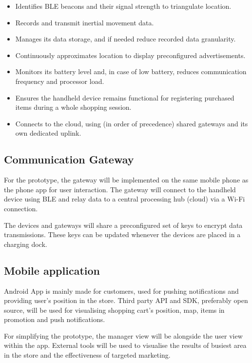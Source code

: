 \documentclass[11pt,]{article}
\providecommand{\tightlist}{%
  \setlength{\itemsep}{0pt}\setlength{\parskip}{0pt}}
\begin{document}
\begin{itemize}
\tightlist
\item
  Identifies BLE beacons and their signal strength to triangulate
  location.
\item
  Records and transmit inertial movement data.
\item
  Manages its data storage, and if needed reduce recorded data
  granularity.
\item
  Continuously approximates location to display preconfigured
  advertisements.
\item
  Monitors its battery level and, in case of low battery, reduces
  communication frequency and processor load.
\item
  Ensures the handheld device remains functional for registering
  purchased items during a whole shopping session.
\item
  Connects to the cloud, using (in order of precedence) shared gateways
  and its own dedicated uplink.
\end{itemize}

\hypertarget{communication-gateway}{%
\subsection{Communication Gateway}\label{communication-gateway}}

For the prototype, the gateway will be implemented on the same mobile
phone as the phone app for user interaction. The gateway will connect to
the handheld device using BLE and relay data to a central processing hub
(cloud) via a Wi-Fi connection.

The devices and gateways will share a preconfigured set of keys to
encrypt data transmissions. These keys can be updated whenever the
devices are placed in a charging dock.

\hypertarget{mobile-application}{%
\subsection{Mobile application}\label{mobile-application}}

Android App is mainly made for customers, used for pushing notifications
and providing user's position in the store. Third party API and SDK,
preferably open source, will be used for visualising shopping cart's
position, map, items in promotion and push notifications.

For simplifying the prototype, the manager view will be alongside the
user view within the app. External tools will be used to visualise the
results of busiest area in the store and the effectiveness of targeted
marketing.
\end{document}
